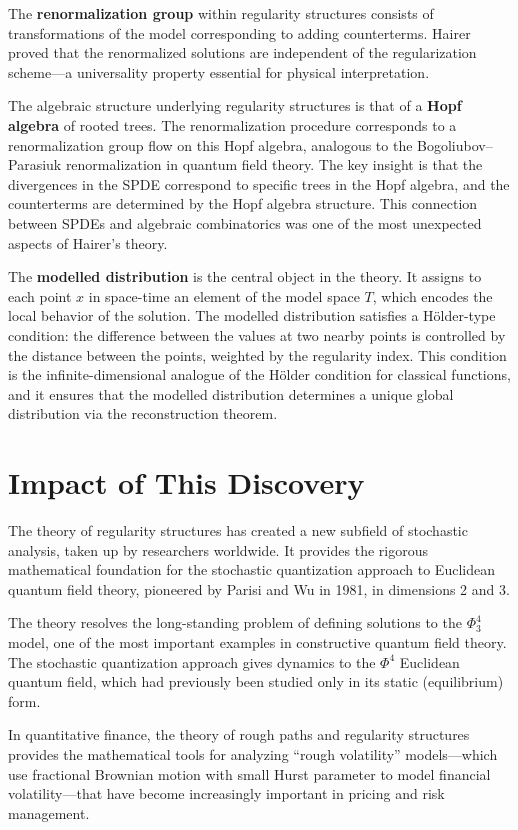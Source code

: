 The \textbf{renormalization group} within regularity structures consists of transformations of the model corresponding to adding counterterms. Hairer proved that the renormalized solutions are independent of the regularization scheme---a universality property essential for physical interpretation.

The algebraic structure underlying regularity structures is that of a \textbf{Hopf algebra} of rooted trees. The renormalization procedure corresponds to a renormalization group flow on this Hopf algebra, analogous to the Bogoliubov--Parasiuk renormalization in quantum field theory. The key insight is that the divergences in the SPDE correspond to specific trees in the Hopf algebra, and the counterterms are determined by the Hopf algebra structure. This connection between SPDEs and algebraic combinatorics was one of the most unexpected aspects of Hairer's theory.

The \textbf{modelled distribution} is the central object in the theory. It assigns to each point $x$ in space-time an element of the model space $T$, which encodes the local behavior of the solution. The modelled distribution satisfies a H\"{o}lder-type condition: the difference between the values at two nearby points is controlled by the distance between the points, weighted by the regularity index. This condition is the infinite-dimensional analogue of the H\"{o}lder condition for classical functions, and it ensures that the modelled distribution determines a unique global distribution via the reconstruction theorem.

\section{Impact of This Discovery}

The theory of regularity structures has created a new subfield of stochastic analysis, taken up by researchers worldwide. It provides the rigorous mathematical foundation for the stochastic quantization approach to Euclidean quantum field theory, pioneered by Parisi and Wu in 1981, in dimensions 2 and 3.

The theory resolves the long-standing problem of defining solutions to the $\Phi^4_3$ model, one of the most important examples in constructive quantum field theory. The stochastic quantization approach gives dynamics to the $\Phi^4$ Euclidean quantum field, which had previously been studied only in its static (equilibrium) form.

In quantitative finance, the theory of rough paths and regularity structures provides the mathematical tools for analyzing ``rough volatility'' models---which use fractional Brownian motion with small Hurst parameter to model financial volatility---that have become increasingly important in pricing and risk management.

